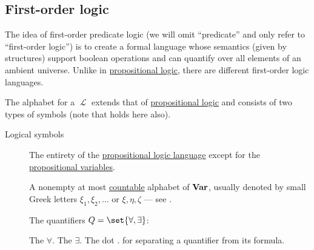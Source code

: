 \subsection{First-order logic}\label{subsec:first_order_logic}

\begin{definition}\label{def:first_order_language}
  The idea of first-order predicate logic (we will omit \enquote{predicate} and only refer to \enquote{first-order logic}) is to create a formal language whose semantics (given by structures) support boolean operations and can quantify over all elements of an ambient universe. Unlike in \hyperref[subsec:propositional_logic]{propositional logic}, there are different first-order logic languages.

  The alphabet for a  \( \mscrL \) extends that of \hyperref[subsec:propositional_logic]{propositional logic} and consists of two types of symbols (note that  holds here also).

  \begin{description}
    \item[Logical symbols]
    \hfill
    \begin{thmenum}[series=def:first_order_language]
       The entirety of the \hyperref[subsec:propositional_logic]{propositional logic language} except for the \hyperref[def:propositional_language/prop]{propositional variables}.

       A nonempty at most \hyperref[rem:cardinals/countably_infinite]{countable} alphabet of  \( \operatorname{\mathbf{Var}} \), usually denoted by small Greek letters \( \xi_1, \xi_2, \ldots \) or \( \xi, \eta, \zeta \) --- see .

       The quantifiers \( Q = \set{ \forall, \exists } \):
      \begin{thmenum}
         The  \( \forall \).
         The  \( \exists \).
         The dot \( . \) for separating a quantifier from its formula.
      \end{thmenum}


\end{thmenum}
\end{description}
\end{definition}
